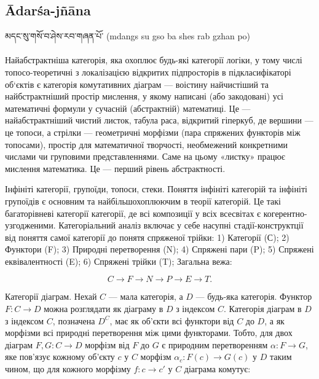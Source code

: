 \newpage
\subsection*{Ādarśa-jñāna}

\ti མདང་སུ་གསོ་བ་ཤེས་རབ་གཞན་པོ་  \ua (mdangs su gso ba shes rab gzhan po)\\
\\
Найабстрактніша категорія, яка охоплює будь-які категорії логіки,
у тому числі топосо-теоретичні з локалізацією відкритих підпросторів
в підкласифікаторі об‘єктів є категорія комутативних діаграм --- воістину
найчистіший та найбстрактніший простір мислення, у якому написані (або закодовані)
усі математичні формули у сучасній (абстрактній) математиці. Це ---
найабстрактніший чистий листок, табула раса, відкритий гіперкуб, де
вершини --- це топоси, а стрілки --- геометричні морфізми (пара спряжених
функторів між топосами), простір для математичної творчості, необмежений
конкретними числами чи груповими представленнями. Саме на цьому «листку»
працює мислення математика. Це --- перший рівень абстрактності.

Інфініті категорії, групоїди, топоси, стеки. Поняття інфініті
категорій та інфініті групоїдів є основним та найбільшохоплюючим
в теорії категорій. Це такі багаторівневі категорії категорії, де
всі композиції у всіх всесвітах є когерентно-узгодженими. Категоріальний
аналіз включає у себе насупні стадії-конструктції від поняття самої
категорії до понятя спряженої трійки:
1) Категорії (С);
2) Функтори (F);
3) Природні перетворення (N);
4) Спряжені пари (P);
5) Спряжені еквівалентності (E);
6) Спряжені трійки (T); Загальна вежа:

$$
C \rightarrow F \rightarrow N \rightarrow P \rightarrow E \rightarrow T.
$$

Категорії діаграм. Нехай $C$ --- мала категорія, а $D$ --- будь-яка категорія.
Функтор $F: C \rightarrow D$ можна розглядати як діаграму в $D$ з індексом $C$.
Категорія діаграм в $D$ з індексом $C$, позначена $D^C$, має як об'єкти всі
функтори від $C$ до $D$, а як морфізми всі природні перетворення між цими
функторами. Тобто, для двох діаграм $F,G: C \rightarrow D$ морфізм від $F$
до $G$ є природним перетворенням $\alpha : F \rightarrow G$, яке пов'язує
кожному об'єкту $c$ у $C$ морфізм $\alpha_c : F(c) \rightarrow G(c)$ у $D$
таким чином, що для кожного морфізму $f: c \rightarrow c'$ у $C$ діаграма комутує:

\begin{center}
\end{center}

